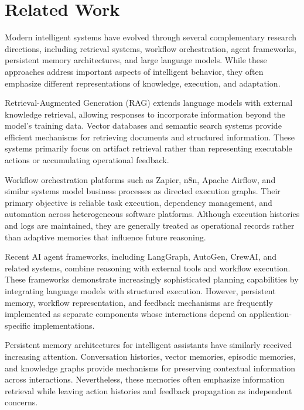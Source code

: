 \section{Related Work}
\label{sec:related-work}

Modern intelligent systems have evolved through several complementary research directions, including retrieval systems, workflow orchestration, agent frameworks, persistent memory architectures, and large language models. While these approaches address important aspects of intelligent behavior, they often emphasize different representations of knowledge, execution, and adaptation.

Retrieval-Augmented Generation (RAG) extends language models with external knowledge retrieval, allowing responses to incorporate information beyond the model's training data. Vector databases and semantic search systems provide efficient mechanisms for retrieving documents and structured information. These systems primarily focus on artifact retrieval rather than representing executable actions or accumulating operational feedback.

Workflow orchestration platforms such as Zapier, n8n, Apache Airflow, and similar systems model business processes as directed execution graphs. Their primary objective is reliable task execution, dependency management, and automation across heterogeneous software platforms. Although execution histories and logs are maintained, they are generally treated as operational records rather than adaptive memories that influence future reasoning.

Recent AI agent frameworks, including LangGraph, AutoGen, CrewAI, and related systems, combine reasoning with external tools and workflow execution. These frameworks demonstrate increasingly sophisticated planning capabilities by integrating language models with structured execution. However, persistent memory, workflow representation, and feedback mechanisms are frequently implemented as separate components whose interactions depend on application-specific implementations.

Persistent memory architectures for intelligent assistants have similarly received increasing attention. Conversation histories, vector memories, episodic memories, and knowledge graphs provide mechanisms for preserving contextual information across interactions. Nevertheless, these memories often emphasize information retrieval while leaving action histories and feedback propagation as independent concerns.

